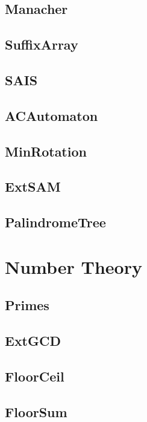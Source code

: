 	\subsection{Manacher}
	
	\subsection{SuffixArray}
	
	\subsection{SAIS}
	
	\subsection{ACAutomaton}
	
	\subsection{MinRotation}
	
	\subsection{ExtSAM}
	
	\subsection{PalindromeTree}
	
\section{Number Theory}
	\subsection{Primes}
	
	\subsection{ExtGCD}
	
	\subsection{FloorCeil}
	
	\subsection{FloorSum}
	
	
